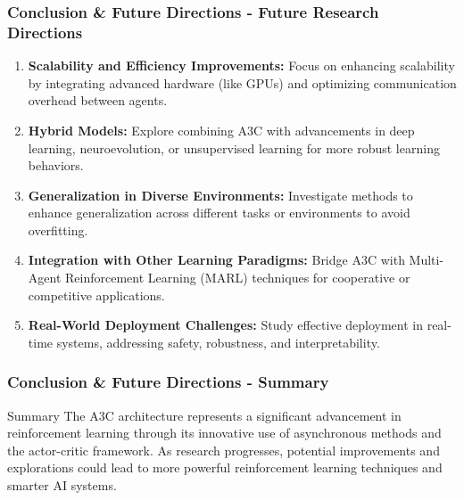 \documentclass{beamer}
\begin{document}
\begin{frame}[fragile]
    \frametitle{Conclusion \& Future Directions - Future Research Directions}
    \begin{enumerate}
        \item \textbf{Scalability and Efficiency Improvements:}  
        Focus on enhancing scalability by integrating advanced hardware (like GPUs) and optimizing communication overhead between agents.
        
        \item \textbf{Hybrid Models:}  
        Explore combining A3C with advancements in deep learning, neuroevolution, or unsupervised learning for more robust learning behaviors.
        
        \item \textbf{Generalization in Diverse Environments:}  
        Investigate methods to enhance generalization across different tasks or environments to avoid overfitting.
        
        \item \textbf{Integration with Other Learning Paradigms:}  
        Bridge A3C with Multi-Agent Reinforcement Learning (MARL) techniques for cooperative or competitive applications.
        
        \item \textbf{Real-World Deployment Challenges:}  
        Study effective deployment in real-time systems, addressing safety, robustness, and interpretability.
    \end{enumerate}
\end{frame}

\begin{frame}[fragile]
    \frametitle{Conclusion \& Future Directions - Summary}
    \begin{block}{Summary}
        The A3C architecture represents a significant advancement in reinforcement learning through its innovative use of asynchronous methods and the actor-critic framework. As research progresses, potential improvements and explorations could lead to more powerful reinforcement learning techniques and smarter AI systems.
    \end{block}
\end{frame}
\end{document}
